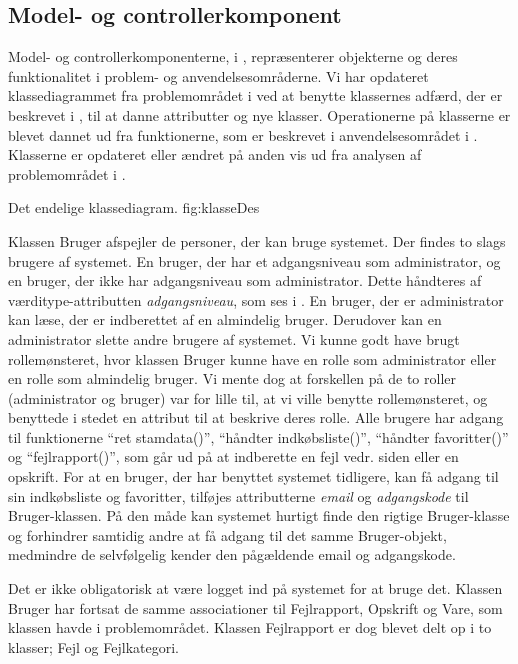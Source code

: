 \subsection{Model- og controllerkomponent}
\label{sec:modelfunktion}

Model- og controllerkomponenterne, i , repræsenterer objekterne og deres funktionalitet i problem- og anvendelsesområderne. Vi har opdateret klassediagrammet fra problemområdet i  ved at benytte klassernes adfærd, der er beskrevet i , til at danne attributter og nye klasser. Operationerne på klasserne er blevet dannet ud fra funktionerne, som er beskrevet i anvendelsesområdet i . Klasserne er opdateret eller ændret på anden vis ud fra analysen af problemområdet i .


	{Det endelige klassediagram.}
	{fig:klasseDes}

Klassen Bruger afspejler de personer, der kan bruge systemet. Der findes to slags brugere af systemet. En bruger, der har et adgangsniveau som administrator, og en bruger, der ikke har adgangsniveau som administrator. Dette håndteres af værditype-attributten \textit{adgangsniveau}, som ses i . En bruger, der er administrator kan læse, der er indberettet af en almindelig bruger. Derudover kan en administrator slette andre brugere af systemet. Vi kunne godt have brugt rollemønsteret, hvor klassen Bruger kunne have en rolle som administrator eller en rolle som almindelig bruger. Vi mente dog at forskellen på de to roller (administrator og bruger) var for lille til, at vi ville benytte rollemønsteret, og benyttede i stedet en attribut til at beskrive deres rolle. Alle brugere har adgang til funktionerne ``ret stamdata()'', ``håndter indkøbsliste()'', ``håndter favoritter()'' og ``fejlrapport()'', som går ud på at indberette en fejl vedr. siden eller en opskrift.
For at en bruger, der har benyttet systemet tidligere, kan få adgang til sin indkøbsliste og favoritter, tilføjes attributterne \textit{email} og \textit{adgangskode} til Bruger-klassen. På den måde kan systemet hurtigt finde den rigtige Bruger-klasse og forhindrer samtidig andre at få adgang til det samme Bruger-objekt, medmindre de selvfølgelig kender den pågældende email og adgangskode.

Det er ikke obligatorisk at være logget ind på systemet for at bruge det. Klassen Bruger har fortsat de samme associationer til Fejlrapport, Opskrift og Vare, som klassen havde i problemområdet. Klassen Fejlrapport er dog blevet delt op i to klasser; Fejl og Fejlkategori.

